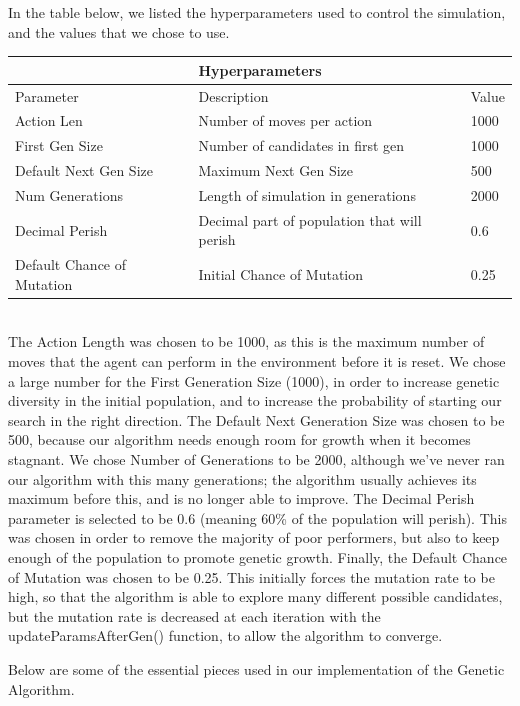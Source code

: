 \documentclass{article}
\begin{document}
In the table below, we listed the hyperparameters used to control the simulation, and the values that we chose to use.\\


\begin{tabular}{ |p{3cm}|p{6cm}|p{1cm}|  }
 \hline
 \multicolumn{3}{|c|}{Hyperparameters} \\
 \hline
 Parameter & Description & Value\\
 \hline
 Action Len   & Number of moves per action & 1000\\
 First Gen Size &   Number of candidates in first gen  & 1000\\
 Default Next Gen Size  &  Maximum Next Gen Size & 500\\
 Num Generations&   Length of simulation in generations  & 2000\\
 Decimal Perish & Decimal part of population that will perish  & 0.6\\
 Default Chance of Mutation & Initial Chance of Mutation  & 0.25\\
 \hline

\end{tabular}\\

The Action Length was chosen to be 1000, as this is the maximum number of moves that the agent can perform in the environment before it is reset. We chose a large number for the First Generation Size (1000), in order to increase genetic diversity in the initial population, and to increase the probability of starting our search in the right direction. The Default Next Generation Size was chosen to be 500, because our algorithm needs enough room for growth when it becomes stagnant. We chose Number of Generations to be 2000, although we've never ran our algorithm with this many generations; the algorithm usually achieves its maximum before this, and is no longer able to improve. The Decimal Perish parameter is selected to be 0.6 (meaning 60\% of the population will perish). This was chosen in order to remove the majority of poor performers, but also to keep enough of the population to promote genetic growth. Finally, the Default Chance of Mutation was chosen to be 0.25. This initially forces the mutation rate to be high, so that the algorithm is able to explore many different possible candidates, but the mutation rate is decreased at each iteration with the updateParamsAfterGen() function, to allow the algorithm to converge. 

Below are some of the essential pieces used in our implementation of the Genetic Algorithm.
\end{document}

